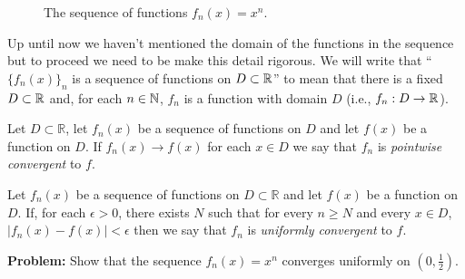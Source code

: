\begin{figure}
  \begin{center}
    \caption{The sequence of functions \(f_n(x)= x^n\).}
  \end{center}
\end{figure}

\noindent
Up until now we haven't mentioned the domain of the functions in the sequence but to proceed we need to be make this detail rigorous.
We will write that ``\({\{f_n(x)\}}_{n}\) is a sequence of functions on \(D\subset \mathbb{R}\)'' to mean that there is a fixed \(D\subset \mathbb{R}\) and, for each \(n\in \mathbb{N}\), \(f_{n}\) is a function with domain \(D\) (i.e., \(f_n : D \to \mathbb{R}\)).


\begin{definition}
  Let \(D\subset \mathbb{R}\),
  let \(f_n(x)\) be a sequence of functions on \(D\)
  and let \(f(x)\) be a function on \(D\).
  If \(f_n(x) \to f(x)\) for each \(x\in D\) we say that \(f_n\) is \emph{pointwise convergent} to \(f\).
\end{definition}

\begin{definition}
  Let \(f_n(x)\) be a sequence of functions on \(D\subset \mathbb{R}\)
  and let \(f(x)\) be a function on \(D\).
  If, for each \(\epsilon>0\), there exists \(N\) such that for every \(n\geq N\) and every \(x\in D\), \(|f_n(x) - f(x)| < \epsilon\) then we say that \(f_n\) is \emph{uniformly convergent} to \(f\).
\end{definition}

\noindent
\textbf{Problem:}
Show that the sequence \(f_n(x) = x^n\) converges uniformly on \((0,\frac{1}{2})\).

